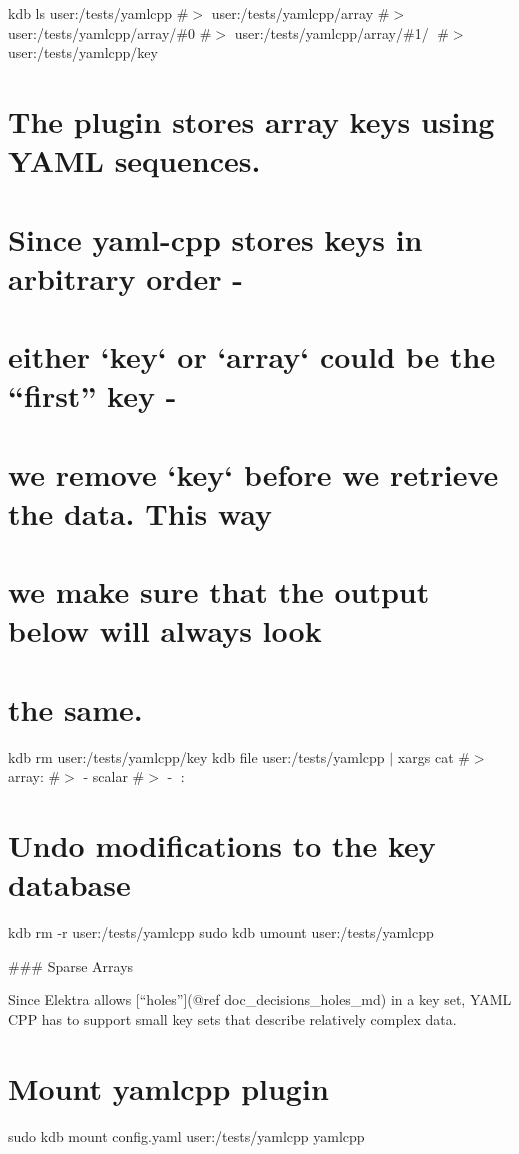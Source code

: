 kdb ls user\+:/tests/yamlcpp \#$>$ user\+:/tests/yamlcpp/array \#$>$ user\+:/tests/yamlcpp/array/\#0 \#$>$ user\+:/tests/yamlcpp/array/\#1/🔑 \#$>$ user\+:/tests/yamlcpp/key\hypertarget{autotoc_md807_autotoc_md841}{}\section{The plugin stores array keys using Y\+A\+M\+L sequences.}\label{autotoc_md807_autotoc_md841}
\hypertarget{autotoc_md807_autotoc_md842}{}\section{Since yaml-\/cpp stores keys in arbitrary order -\/}\label{autotoc_md807_autotoc_md842}
\hypertarget{autotoc_md807_autotoc_md843}{}\section{either `key` or `array` could be the “first” key -\/}\label{autotoc_md807_autotoc_md843}
\hypertarget{autotoc_md807_autotoc_md844}{}\section{we remove `key` before we retrieve the data. This way}\label{autotoc_md807_autotoc_md844}
\hypertarget{autotoc_md807_autotoc_md845}{}\section{we make sure that the output below will always look}\label{autotoc_md807_autotoc_md845}
\hypertarget{autotoc_md807_autotoc_md846}{}\section{the same.}\label{autotoc_md807_autotoc_md846}
kdb rm user\+:/tests/yamlcpp/key kdb file user\+:/tests/yamlcpp $\vert$ xargs cat \#$>$ array\+: \#$>$ -\/ scalar \#$>$ -\/ 🔑\+: 🙈\hypertarget{autotoc_md807_autotoc_md847}{}\section{Undo modifications to the key database}\label{autotoc_md807_autotoc_md847}
kdb rm -\/r user\+:/tests/yamlcpp sudo kdb umount user\+:/tests/yamlcpp 
\begin{DoxyCode}
### Sparse Arrays

Since Elektra allows [“holes”](@ref doc\_decisions\_holes\_md) in a key set, YAML CPP has to support small key
       sets that describe relatively complex data.
\end{DoxyCode}
 \hypertarget{autotoc_md807_autotoc_md848}{}\section{Mount yamlcpp plugin}\label{autotoc_md807_autotoc_md848}
sudo kdb mount config.\+yaml user\+:/tests/yamlcpp yamlcpp

